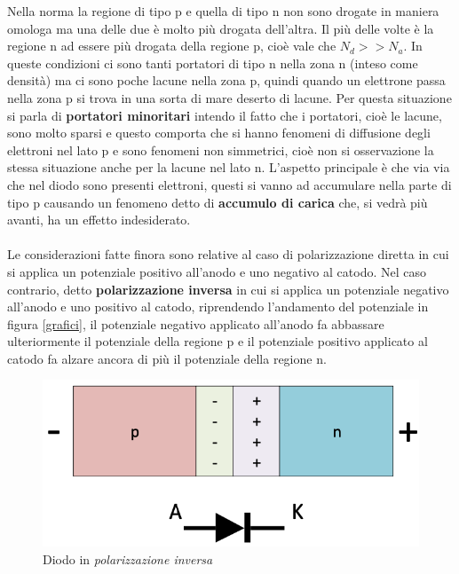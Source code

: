 \documentclass[12pt, a4paper]{report}
\begin{document}
Nella norma la regione di tipo p e quella di tipo n non sono drogate in maniera omologa ma una delle due è molto più drogata dell'altra. Il più delle volte è la regione n ad essere più drogata della regione p, cioè vale che $N_{d} >> N_{a}$. In queste condizioni ci sono tanti portatori di tipo n nella zona n (inteso come densità) ma ci sono poche lacune nella zona p, quindi quando un elettrone passa nella zona p si trova in una sorta di mare deserto di lacune. Per questa situazione si parla di \textbf{portatori minoritari} intendo il fatto che i portatori, cioè le lacune, sono molto sparsi e questo comporta che si hanno fenomeni di diffusione degli elettroni nel lato p e sono fenomeni non simmetrici, cioè non si osservazione la stessa situazione anche per la lacune nel lato n. L'aspetto principale è che via via che nel diodo sono presenti elettroni, questi si vanno ad accumulare nella parte di tipo p causando un fenomeno detto di \textbf{accumulo di carica} che, si vedrà più avanti, ha un effetto indesiderato.
\\\\Le considerazioni fatte finora sono relative al caso di polarizzazione diretta in cui si applica un potenziale positivo all'anodo e uno negativo al catodo. Nel caso contrario, detto \textbf{polarizzazione inversa} in cui si applica un potenziale negativo all'anodo e uno positivo al catodo, riprendendo l'andamento del potenziale in figura \ref{grafici}, il potenziale negativo applicato all'anodo fa abbassare ulteriormente il potenziale della regione p e il potenziale positivo applicato al catodo fa alzare ancora di più il potenziale della regione n.
\begin{figure}[h]
\centering
\includegraphics[scale=0.5,angle=0]{diodo_polarizzazione_inversa.png}
\caption{Diodo in \textit{polarizzazione inversa}}
\end{figure}
\end{document}
